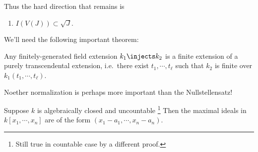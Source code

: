 Thus the hard direction that remains is

\begin{enumerate}
\def\labelenumi{\alph{enumi}.}
\setcounter{enumi}{3}
\tightlist
\item
  \(I(V(J)) \subset \sqrt{J}\).
\end{enumerate}

We'll need the following important theorem:

\begin{theorem}

Any finitely-generated field extension \(k_1 \injects k_2\) is a finite
extension of a purely transcendental extension, i.e.~there exist
\(t_1, \cdots, t_\ell\) such that \(k_2\) is finite over
\(k_1(t_1, \cdots, t_\ell)\).

\end{theorem}

\begin{warnings}

Noether normalization is perhaps more important than the
Nullstellensatz!

\end{warnings}

\begin{theorem}

Suppose \(k\) is algebraically closed and uncountable \footnote{Still
  true in countable case by a different proof.} Then the maximal ideals
in \(k[x_1, \cdots, x_n]\) are of the form
\((x_1 - a_1, \cdots, x_n - a_n)\).

\end{theorem}

